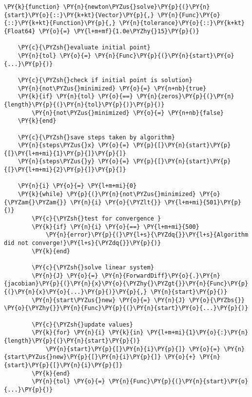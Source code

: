     \begin{tcolorbox}[breakable, size=fbox, boxrule=1pt, pad at break*=1mm,colback=cellbackground, colframe=cellborder]
\begin{Verbatim}[commandchars=\\\{\}]
\PY{k}{function} \PY{n}{newton\PYZus{}solve}\PY{p}{(}\PY{n}{start}\PY{o}{::}\PY{k+kt}{Vector}\PY{p}{,} \PY{n}{Func}\PY{o}{::}\PY{k+kt}{Function}\PY{p}{,} \PY{n}{tolerance}\PY{o}{::}\PY{k+kt}{Float64} \PY{o}{=} \PY{l+m+mf}{1.0e\PYZhy{}15}\PY{p}{)}

    \PY{c}{\PYZsh{}evaluate initial point}
    \PY{n}{tol} \PY{o}{=} \PY{n}{Func}\PY{p}{(}\PY{n}{start}\PY{o}{...}\PY{p}{)}

    \PY{c}{\PYZsh{}check if initial point is solution}
    \PY{n}{not\PYZus{}minimized} \PY{o}{=} \PY{n+nb}{true}
    \PY{k}{if} \PY{n}{tol} \PY{o}{==} \PY{n}{zeros}\PY{p}{(}\PY{n}{length}\PY{p}{(}\PY{n}{tol}\PY{p}{)}\PY{p}{)}
        \PY{n}{not\PYZus{}minimized} \PY{o}{=} \PY{n+nb}{false}
    \PY{k}{end}

    \PY{c}{\PYZsh{}save steps taken by algorithm}
    \PY{n}{steps\PYZus{}x} \PY{o}{=} \PY{p}{[}\PY{n}{start}\PY{p}{[}\PY{l+m+mi}{1}\PY{p}{]}\PY{p}{]}
    \PY{n}{steps\PYZus{}y} \PY{o}{=} \PY{p}{[}\PY{n}{start}\PY{p}{[}\PY{l+m+mi}{2}\PY{p}{]}\PY{p}{]}
    
    \PY{n}{i} \PY{o}{=} \PY{l+m+mi}{0}
    \PY{k}{while} \PY{p}{(}\PY{n}{not\PYZus{}minimized} \PY{o}{\PYZam{}\PYZam{}} \PY{n}{i} \PY{o}{\PYZlt{}} \PY{l+m+mi}{501}\PY{p}{)}
        \PY{c}{\PYZsh{}test for convergence }
        \PY{k}{if} \PY{n}{i} \PY{o}{==} \PY{l+m+mi}{500}
            \PY{n}{error}\PY{p}{(}\PY{l+s}{\PYZdq{}}\PY{l+s}{Algorithm did not converge!}\PY{l+s}{\PYZdq{}}\PY{p}{)}
        \PY{k}{end}

        \PY{c}{\PYZsh{}solve linear system}
        \PY{n}{J} \PY{o}{=} \PY{n}{ForwardDiff}\PY{o}{.}\PY{n}{jacobian}\PY{p}{(}\PY{n}{x}\PY{o}{\PYZhy{}\PYZgt{}}\PY{n}{Func}\PY{p}{(}\PY{n}{x}\PY{o}{...}\PY{p}{)}\PY{p}{,} \PY{n}{start}\PY{p}{)}
        \PY{n}{start\PYZus{}new} \PY{o}{=} \PY{n}{J} \PY{o}{\PYZbs{}} \PY{o}{\PYZhy{}}\PY{n}{Func}\PY{p}{(}\PY{n}{start}\PY{o}{...}\PY{p}{)}

        \PY{c}{\PYZsh{}update values}
        \PY{k}{for} \PY{n}{i} \PY{k}{in} \PY{l+m+mi}{1}\PY{o}{:}\PY{n}{length}\PY{p}{(}\PY{n}{start}\PY{p}{)}
            \PY{n}{start}\PY{p}{[}\PY{n}{i}\PY{p}{]} \PY{o}{=} \PY{n}{start\PYZus{}new}\PY{p}{[}\PY{n}{i}\PY{p}{]} \PY{o}{+} \PY{n}{start}\PY{p}{[}\PY{n}{i}\PY{p}{]}
        \PY{k}{end}
        \PY{n}{tol} \PY{o}{=} \PY{n}{Func}\PY{p}{(}\PY{n}{start}\PY{o}{...}\PY{p}{)}


\end{Verbatim}
\end{tcolorbox}
